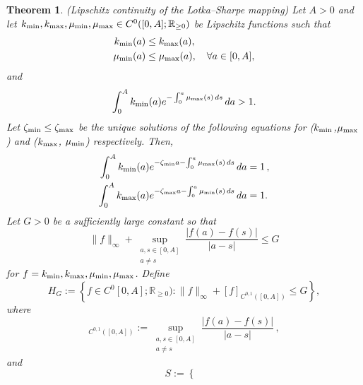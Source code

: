 \documentclass[journal,twoside,web]{ieeecolor}
\newtheorem{theorem}{Theorem}
\begin{document}
\begin{theorem} \emph{(Lipschitz continuity of the Lotka--Sharpe mapping)} %
\label{thm-LS-Lip}
Let $A>0$ and let $k_{\rm min},k_{\rm max},\mu_{\rm min},\mu_{\rm max} \in C^0([0,A];\mathbb{R}_{\ge 0})$ be Lipschitz functions such that
\begin{align}
\label{eq-k1k2}
k_{\rm min}(a)&\le k_{\rm max}(a),  \nonumber \\  \mu_{\rm min}(a)&\le \mu_{\rm max}(a),
\quad \forall a\in[0,A],
\end{align}
and
\begin{equation}
\label{eq-int>1}
\int_0^A k_{\rm min}(a)e^{-\int_0^a \mu_{\rm max}(s)\,ds}\,da > 1.
\end{equation}
Let $\zeta_{\rm min}\leq \zeta_{\rm max}$ be the unique solutions of the following equations for ($k_{\rm min}$,$\mu_{\rm max}$) and ($k_{\rm max}$, $\mu_{\rm min}$) respectively. Then, 
\begin{align}
\label{eq-LS-map-1-2}
\int_0^A k_{\rm min}(a)e^{-\zeta_{\rm min} a-\int_0^a \mu_{\rm max}(s)\,ds}\,da &= 1\,, \\ 
\int_0^A k_{\rm max}(a)e^{-\zeta_{\rm max} a-\int_0^a \mu_{\rm min}(s)\,ds}\,da &= 1.
\end{align}
Let $G>0$ be a sufficiently large constant so that
\begin{equation}
\|f\|_\infty + \sup_{\substack{a,s\in[0,A]\\ a\ne s}} \frac{|f(a)-f(s)|}{|a-s|} \le G
\end{equation}
for $f=k_{\rm min},k_{\rm max},\mu_{\rm min},\mu_{\rm max}$. Define
\begin{equation}
\label{eq:set_HG}
H_G := \left\{
f \in C^0[0,A];\mathbb{R}_{\ge 0}) :
\|f\|_\infty + [f]_{C^{0,1}([0,A])} \le G
\right\},
\end{equation}
where 
\begin{equation}
[f]_{C^{0,1}([0,A])}
:=
\sup_{\substack{a,s\in[0,A]\\ a\ne s}}
\frac{|f(a)-f(s)|}{|a-s|}\,, 
\end{equation}
and
\begin{equation}
\label{eq:set_S}
S := \left\{
\begin{aligned}

\end{aligned}
\end{equation}
\end{theorem}
\end{document}
